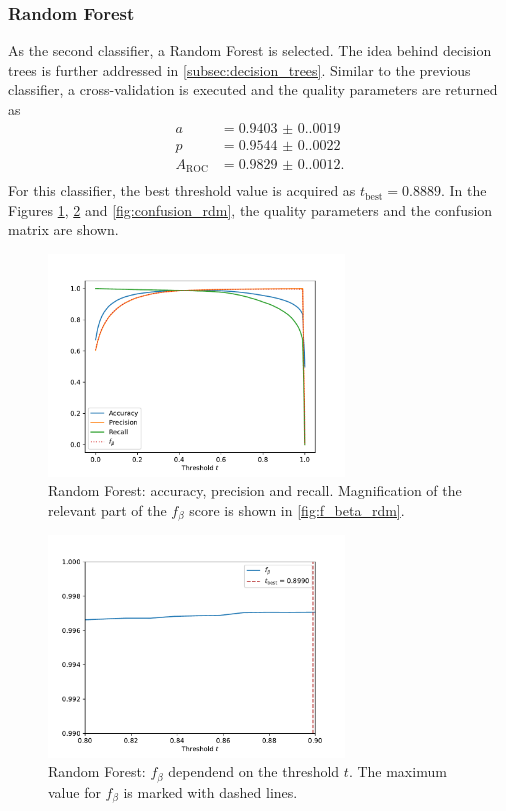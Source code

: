 \subsubsection{Random Forest}
As the second classifier, a Random Forest is selected. The idea behind decision trees is further addressed in \autoref{subsec:decision_trees}. Similar to the previous classifier,
a cross-validation is executed and the quality parameters are returned as
\begin{align*}
    a &= \num{0.9403(0.0019)} \\
    p &= \num{0.9544(0.0022)}  \\
    A_{\mathrm{ROC}} &= \num{0.9829(0.0012)}. \\
\end{align*}
For this classifier, the best threshold value is acquired as $t_{\mathrm{best}} = \num{0.8889}$. In the Figures \ref{fig:apr_rdm}, \ref{fig:f_beta_rdm} and \ref{fig:confusion_rdm}, the quality parameters
and the confusion matrix are shown.
\begin{figure}
    \centering
    \includegraphics[width=0.7\textwidth]{content/plots/apr_rdm.pdf}
    \caption{Random Forest: accuracy, precision and recall. Magnification of the relevant part of the $f_{\beta}$ score is shown in \autoref{fig:f_beta_rdm}.}
    \label{fig:apr_rdm}
\end{figure}
\begin{figure}
    \centering
    \includegraphics[width=0.7\textwidth]{content/plots/f_beta_rdm.pdf}
    \caption{Random Forest: $f_{\beta}$ dependend on the threshold $t$. The maximum value for $f_{\beta}$ is marked with dashed lines.}
    \label{fig:f_beta_rdm}
\end{figure}
